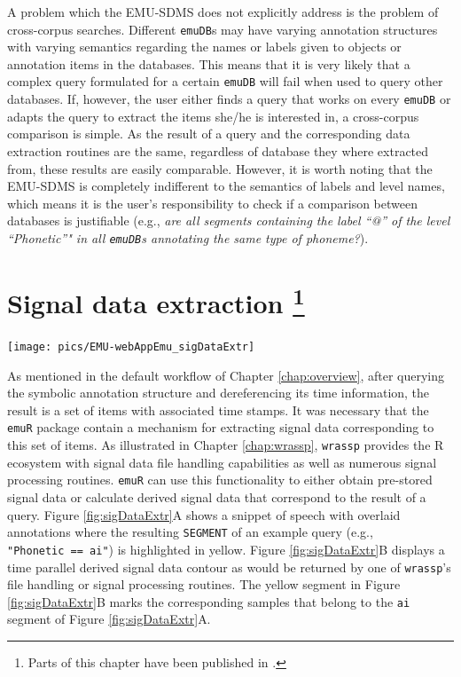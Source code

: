 \documentclass[]{book}
\begin{document}
A problem which the EMU-SDMS does not explicitly address is the problem of cross-corpus searches. Different \texttt{emuDB}s may have varying annotation structures with varying semantics regarding the names or labels given to objects or annotation items in the databases. This means that it is very likely that a complex query formulated for a certain \texttt{emuDB} will fail when used to query other databases. If, however, the user either finds a query that works on every \texttt{emuDB} or adapts the query to extract the items she/he is interested in, a cross-corpus comparison is simple. As the result of a query and the corresponding data extraction routines are the same, regardless of database they where extracted from, these results are easily comparable. However, it is worth noting that the EMU-SDMS is completely indifferent to the semantics of labels and level names, which means it is the user's responsibility to check if a comparison between databases is justifiable (e.g., \emph{are all segments containing the label ``@'' of the level ``Phonetic''" in all \texttt{emuDB}s annotating the same type of phoneme?}).

\hypertarget{chap:sigDataExtr}{%
\chapter[Signal data extraction ]{\texorpdfstring{Signal data extraction \footnote{Parts of this chapter have been published in \citet{winkelmann:2017aa}.}}{Signal data extraction }}\label{chap:sigDataExtr}}

\begin{center}\texttt{[image: pics/EMU-webAppEmu\_sigDataExtr]} \end{center}

As mentioned in the default workflow of Chapter \ref{chap:overview}, after querying the symbolic annotation structure and dereferencing its time information, the result is a set of items with associated time stamps. It was necessary that the \texttt{emuR} package contain a mechanism for extracting signal data corresponding to this set of items. As illustrated in Chapter \ref{chap:wrassp}, \texttt{wrassp} provides the R ecosystem with signal data file handling capabilities as well as numerous signal processing routines. \texttt{emuR} can use this functionality to either obtain pre-stored signal data or calculate derived signal data that correspond to the result of a query. Figure \ref{fig:sigDataExtr}A shows a snippet of speech with overlaid annotations where the resulting \texttt{SEGMENT} of an example query (e.g., \texttt{"Phonetic\ ==\ ai"}) is highlighted in yellow. Figure \ref{fig:sigDataExtr}B displays a time parallel derived signal data contour as would be returned by one of \texttt{wrassp}'s file handling or signal processing routines. The yellow segment in Figure \ref{fig:sigDataExtr}B marks the corresponding samples that belong to the \texttt{ai} segment of Figure \ref{fig:sigDataExtr}A.
\end{document}
